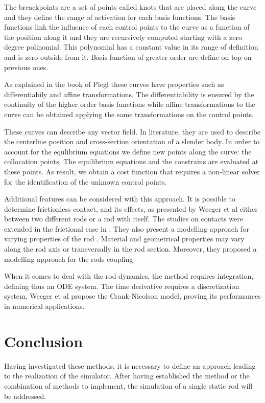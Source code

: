 \documentclass{thesisreport}
\begin{document}
  The breackpoints are a set of points called knots that are placed along the curve and they define the range of activation for each basis functions. The basis functions link the influence of each control points to the curve as a function of the position along it and they are recursively computed starting with a zero degree polinomial. This polynomial has a constant value in its range of definition and is zero outside from it. Basis function of greater order are define on top on previous ones. 
  
 As explained in the book of Piegl \cite{piegl_nurbs_1997} these curves have properties such as differentiabily and affine transformations. The differentiability is ensured by the continuity of the higher order basis functions while affine transformations to the curve can be obtained applying the same transformations on the control points.
 
 These curves can describe any vector field. In literature\cite{weeger_isogeometric_2017-1}, they are used to describe the centerline position and cross-section orientation of a slender body. In order to account for the equlibrium equations we define new points along the curve: the collocation points. The equilibrium equations and the constrains are evaluated at these points. As result, we obtain a cost function that requires a non-linear solver for the identification of the unknown control points.
 
 Additional features can be considered with this approach. It is possible to determine frictionless contact, and its effects, as presented by Weeger et al\cite{weeger_isogeometric_2017} either between two different rods or a rod with itself. The studies on contacts were extended in the frictional case in \cite{weeger_isogeometric_2018}. They also present a modelling approach for varying properties of the rod \cite{weeger_fully_2018}. Material and geometrical properties may vary along the rod axis or transversally in the rod section. Moreover, they proposed a modelling approach for the rods coupling \cite{weeger_isogeometric_2017-1}
 
 When it comes to deal with the rod dynamics, the method requires integration, defining thus an ODE system. The time derivative requires a discretization system, Weeger et al \cite{weeger_isogeometric_2018} propose the Crank-Nicolson model, proving its performances in numerical applications. 


 \chapter*{Conclusion}
 Having investigated these methods, it is necessary to define an approach leading to the realization of the simulator. After having established the method or the combination of methods to implement, the simulation of a single static rod will be addressed. 
 
 

 
 
 
 
 
 
\end{document}
